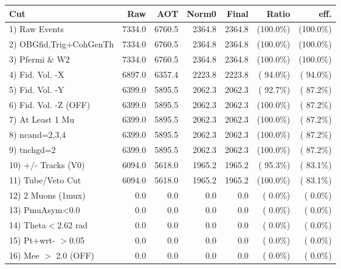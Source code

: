  \begin{table}[h!]\centering
 \begin{tabular}{||l||r|r|r|r|r|r||}
 \hline
 \hline
 Cut & Raw & AOT & Norm0 & Final & Ratio & eff.       \\
 \hline
  1) Raw Events           &       7334.0 &       6760.5 &       2364.8 &       2364.8 & (100.0\%) & (100.0\%) \\
  2) OBGfid,Trig+CohGenTh &       7334.0 &       6760.5 &       2364.8 &       2364.8 & (100.0\%) & (100.0\%) \\
  3) Pfermi \& W2         &       7334.0 &       6760.5 &       2364.8 &       2364.8 & (100.0\%) & (100.0\%) \\
  4) Fid. Vol. -X         &       6897.0 &       6357.4 &       2223.8 &       2223.8 & ( 94.0\%) & ( 94.0\%) \\
  5) Fid. Vol. -Y         &       6399.0 &       5895.5 &       2062.3 &       2062.3 & ( 92.7\%) & ( 87.2\%) \\
  6) Fid. Vol. -Z (OFF)   &       6399.0 &       5895.5 &       2062.3 &       2062.3 & (100.0\%) & ( 87.2\%) \\
  7) At Least 1 Mu        &       6399.0 &       5895.5 &       2062.3 &       2062.3 & (100.0\%) & ( 87.2\%) \\
  8) ncand=2,3,4          &       6399.0 &       5895.5 &       2062.3 &       2062.3 & (100.0\%) & ( 87.2\%) \\
  9) tnchgd=2             &       6399.0 &       5895.5 &       2062.3 &       2062.3 & (100.0\%) & ( 87.2\%) \\
 10) +/- Tracks (V0)      &       6094.0 &       5618.0 &       1965.2 &       1965.2 & ( 95.3\%) & ( 83.1\%) \\
 11) Tube/Veto Cut        &       6094.0 &       5618.0 &       1965.2 &       1965.2 & (100.0\%) & ( 83.1\%) \\
 12) 2 Muons (1mux)       &          0.0 &          0.0 &          0.0 &          0.0 & (  0.0\%) & (  0.0\%) \\
 13) PmuAsym<0.0          &          0.0 &          0.0 &          0.0 &          0.0 & (  0.0\%) & (  0.0\%) \\
 14) Theta$<$2.62 rad     &          0.0 &          0.0 &          0.0 &          0.0 & (  0.0\%) & (  0.0\%) \\
 15) Pt+wrt- $>$0.05      &          0.0 &          0.0 &          0.0 &          0.0 & (  0.0\%) & (  0.0\%) \\
 16) Mee $>$ 2.0  (OFF)   &          0.0 &          0.0 &          0.0 &          0.0 & (  0.0\%) & (  0.0\%) \\

\end{tabular}
\end{table}
